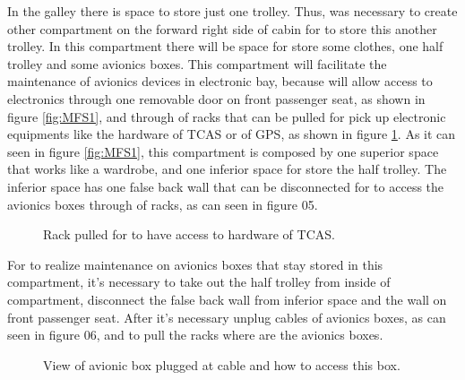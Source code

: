 ﻿In the galley there is space to store just one trolley. Thus, was necessary to create other compartment on the forward right side of cabin for to store this another trolley. In this compartment there will be space for store some clothes, one half trolley and some avionics boxes. This compartment will facilitate the maintenance of avionics devices in electronic bay, because will allow access to electronics through one removable door on front passenger seat, as shown in figure \ref{fig:MFS1}, and through of racks that can be pulled for pick up electronic equipments like the hardware of TCAS or of GPS, as shown in figure \ref{fig:MFS2}.  As it can seen in figure \ref{fig:MFS1}, this compartment is composed by one superior space that works like a wardrobe, and one inferior space for store the half trolley. The inferior space has one false back wall that can be disconnected for to access the avionics boxes through of racks, as can seen in figure 05.



\begin{figure}[H]
\caption{Rack pulled for to have access to hardware of TCAS.}
\label{fig:MFS2}
\end{figure}

For to realize maintenance on avionics boxes that stay stored in this compartment, it's necessary to take out the half trolley from inside of compartment, disconnect the false back wall from inferior space and the wall on front passenger seat. After it's necessary unplug cables of avionics boxes, as can seen in figure 06, and to pull the racks where are the avionics boxes.
\begin{figure}[H]
\caption{View of avionic box plugged at cable and how to access this box.}
\label{fig:MFS3}
\end{figure}
